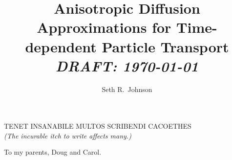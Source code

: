 \documentclass[twoside]{umthesis}
\author{Seth R.~Johnson}
\title{Anisotropic Diffusion Approximations for Time-dependent Particle
Transport\texorpdfstring{\\%
  \emph{DRAFT: \today}}{}
}
\begin{document}
\allowdisplaybreaks
\setlength{\parskip}{0pt plus 0pt minus 0pt}

\frontmatter

\maketitle


\begin{frontispiece}
\centering
TENET INSANABILE MULTOS SCRIBENDI CACOETHES
\\
{\small \itshape (The incurable itch to write affects many.)}
\end{frontispiece}
  


\begin{dedication}
  To my parents, Doug and Carol.
\end{dedication}

\end{document}
